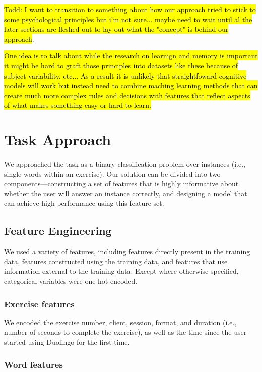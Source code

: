 \documentclass[11pt,a4paper]{article}
\begin{document}
\hl{ Todd: I want to transition to something about how our approach tried to stick to some
psychological principles but i'm not sure... maybe need to wait until al the later sections
are fleshed out to lay out what the "concept" is behind our approach}.

\hl{One idea is to talk about while the research on learnign and memory is important
it might be hard to graft those principles into datasets like these because of 
subject variability, etc... As a result it is unlikely that straightfoward
cognitive models will work but instead need to combine maching learning methods
that can create much more complex rules and decisions with features that reflect
aspects of what makes something easy or hard to learn.}


\cite{Tubridy:2018aa}
\cite{Tubridy:2018ab}
\cite{Corbett1995bkt}
\cite{Roediger2006te,Anderson1994rif,Mozer:2009cs}
\section{Task Approach}

We approached the task as a binary classification problem over instances (i.e.,
single words within an exercise). Our solution can be divided into two
components---constructing a set of features that is highly informative about
whether the user will answer an instance correctly, and designing a model that
can achieve high performance using this feature set.

\subsection{Feature Engineering}

We used a variety of features, including features directly present in the
training data, features constructed using the training data, and features that
use information external to the training data. Except where otherwise specified,
categorical variables were one-hot encoded.

\subsubsection{Exercise features}

We encoded the exercise number, client, session, format, and duration (i.e., number of
seconds to complete the exercise), as well as the time since the user started using Duolingo for the first time.

\subsubsection{Word features}
\end{document}
